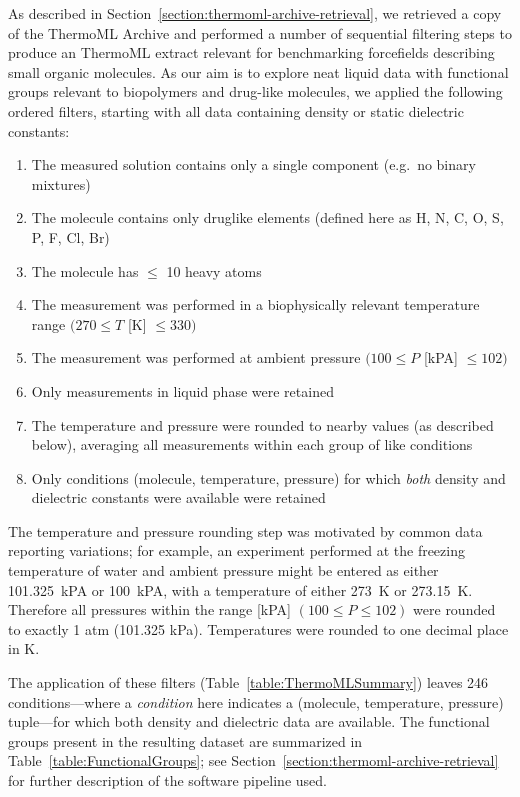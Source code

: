 \documentclass[aps,pre,twocolumn,nofootinbib,superscriptaddress,linenumbers]{revtex4-1}
\begin{document}
As described in Section~\ref{section:thermoml-archive-retrieval}, we retrieved a copy of the ThermoML Archive and performed a number of sequential filtering steps to produce an ThermoML extract relevant for benchmarking forcefields describing small organic molecules.  
As our aim is to explore neat liquid data with functional groups relevant to biopolymers and drug-like molecules, we applied the following ordered filters, starting with all data containing density or static dielectric constants: 
\begin{enumerate}
 \item The measured solution contains only a single component (e.g.~no binary mixtures)
 \item The molecule contains only druglike elements (defined here as H, N, C, O, S, P, F, Cl, Br)
 \item The molecule has $\le$ 10 heavy atoms
 \item The measurement was performed in a biophysically relevant temperature range $(270 \le T$ [K] $\le 330)$
 \item The measurement was performed at ambient pressure $(100 \le P$ [kPA]  $\le 102)$
 \item Only measurements in liquid phase were retained
 \item The temperature and pressure were rounded to nearby values (as described below), averaging all measurements within each group of like conditions
 \item Only conditions (molecule, temperature, pressure) for which \emph{both} density and dielectric constants were available were retained
\end{enumerate}
The temperature and pressure rounding step was motivated by common data reporting variations; for example, an experiment performed at the freezing temperature of water and ambient pressure might be entered as either 101.325~kPA or 100~kPA, with a temperature of either 273~K or 273.15~K.  
Therefore all pressures within the range [kPA] $(100 \le P \le 102)$ were rounded to exactly 1 atm (101.325 kPa).  
Temperatures were rounded to one decimal place in K. 

The application of these filters (Table~\ref{table:ThermoMLSummary}) leaves 246 conditions---where a \emph{condition} here indicates a (molecule, temperature, pressure) tuple---for which both density and dielectric data are available.  
The functional groups present in the resulting dataset are summarized in Table~\ref{table:FunctionalGroups}; see Section~\ref{section:thermoml-archive-retrieval} for further description of the software pipeline used.  
\end{document}
